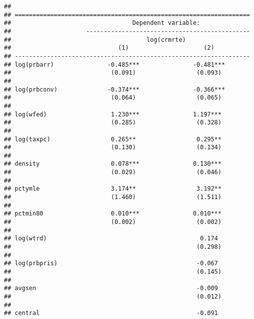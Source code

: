 \documentclass[]{article}
\begin{document}
\begin{verbatim}
## 
## ==================================================================
##                                  Dependent variable:              
##                     ----------------------------------------------
##                                      log(crmrte)                  
##                              (1)                     (2)          
## ------------------------------------------------------------------
## log(prbarr)               -0.485***               -0.481***       
##                            (0.091)                 (0.093)        
##                                                                   
## log(prbconv)              -0.374***               -0.366***       
##                            (0.064)                 (0.065)        
##                                                                   
## log(wfed)                  1.230***               1.197***        
##                            (0.285)                 (0.328)        
##                                                                   
## log(taxpc)                 0.265**                 0.295**        
##                            (0.130)                 (0.134)        
##                                                                   
## density                    0.078***               0.130***        
##                            (0.029)                 (0.046)        
##                                                                   
## pctymle                    3.174**                 3.192**        
##                            (1.460)                 (1.511)        
##                                                                   
## pctmin80                   0.010***               0.010***        
##                            (0.002)                 (0.002)        
##                                                                   
## log(wtrd)                                           0.174         
##                                                    (0.298)        
##                                                                   
## log(prbpris)                                       -0.067         
##                                                    (0.145)        
##                                                                   
## avgsen                                             -0.009         
##                                                    (0.012)        
##                                                                   
## central                                            -0.091         

\end{verbatim}
\end{document}
